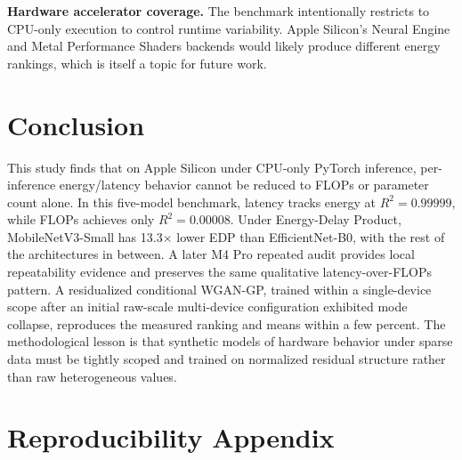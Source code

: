 \documentclass{svproc}
\begin{document}
\textbf{Hardware accelerator coverage.} The benchmark intentionally restricts
to CPU-only execution to control runtime variability. Apple Silicon's Neural
Engine and Metal Performance Shaders backends would likely produce different
energy rankings, which is itself a topic for future work.

\section{Conclusion}
This study finds that on Apple Silicon under CPU-only PyTorch inference,
per-inference energy/latency behavior cannot be reduced to FLOPs or parameter
count alone.
In this five-model benchmark, latency tracks energy at $R^2 = 0.99999$,
while FLOPs achieves only $R^2 = 0.00008$. Under Energy-Delay Product,
MobileNetV3-Small has 13.3$\times$ lower EDP than EfficientNet-B0, with the
rest of the architectures in between. A later M4 Pro repeated audit provides
local repeatability evidence and preserves the same qualitative
latency-over-FLOPs pattern. A residualized conditional WGAN-GP,
trained within a single-device
scope after an initial raw-scale multi-device configuration exhibited mode
collapse, reproduces the measured ranking and means within a few percent.
The methodological lesson is that synthetic models of hardware behavior
under sparse data must be tightly scoped and trained on normalized residual
structure rather than raw heterogeneous values.

\section{Reproducibility Appendix}
\label{sec:appendix}
\end{document}
